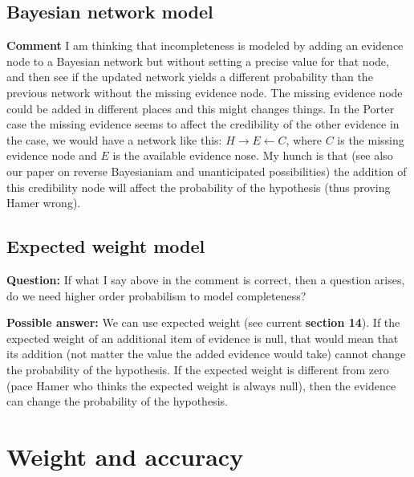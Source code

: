 \documentclass[
  10pt,
  dvipsnames,enabledeprecatedfontcommands]{scrartcl}
\begin{document}
\hypertarget{bayesian-network-model}{%
\subsection{Bayesian network model}\label{bayesian-network-model}}

\textbf{Comment} I am thinking that incompleteness is modeled by adding
an evidence node to a Bayesian network but without setting a precise
value for that node, and then see if the updated network yields a
different probability than the previous network without the missing
evidence node. The missing evidence node could be added in different
places and this might changes things. In the Porter case the missing
evidence seems to affect the credibility of the other evidence in the
case, we would have a network like this:
\(H\rightarrow E \leftarrow C\), where \(C\) is the missing evidence
node and \(E\) is the available evidence nose. My hunch is that (see
also our paper on reverse Bayesianiam and unanticipated possibilities)
the addition of this credibility node will affect the probability of the
hypothesis (thus proving Hamer wrong).

\hypertarget{expected-weight-model}{%
\subsection{Expected weight model}\label{expected-weight-model}}

\textbf{Question:} If what I say above in the comment is correct, then a
question arises, do we need higher order probabilism to model
completeness?

\textbf{Possible answer:} We can use expected weight (see current
\textbf{section 14}). If the expected weight of an additional item of
evidence is null, that would mean that its addition (not matter the
value the added evidence would take) cannot change the probability of
the hypothesis. If the expected weight is different from zero (pace
Hamer who thinks the expected weight is always null), then the evidence
can change the probability of the hypothesis.


\hypertarget{weight-and-accuracy}{%
\section{Weight and accuracy}\label{weight-and-accuracy}}
\end{document}
